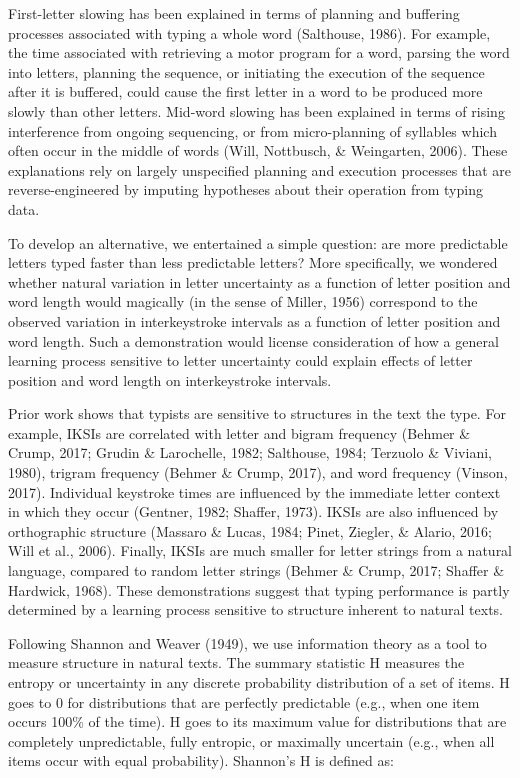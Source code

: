 \documentclass[,man,floatsintext]{apa6}
\begin{document}
First-letter slowing has been explained in terms of planning and buffering processes associated with typing a whole word (Salthouse, 1986). For example, the time associated with retrieving a motor program for a word, parsing the word into letters, planning the sequence, or initiating the execution of the sequence after it is buffered, could cause the first letter in a word to be produced more slowly than other letters. Mid-word slowing has been explained in terms of rising interference from ongoing sequencing, or from micro-planning of syllables which often occur in the middle of words (Will, Nottbusch, \& Weingarten, 2006). These explanations rely on largely unspecified planning and execution processes that are reverse-engineered by imputing hypotheses about their operation from typing data.

To develop an alternative, we entertained a simple question: are more predictable letters typed faster than less predictable letters? More specifically, we wondered whether natural variation in letter uncertainty as a function of letter position and word length would magically (in the sense of Miller, 1956) correspond to the observed variation in interkeystroke intervals as a function of letter position and word length. Such a demonstration would license consideration of how a general learning process sensitive to letter uncertainty could explain effects of letter position and word length on interkeystroke intervals.

Prior work shows that typists are sensitive to structures in the text the type. For example, IKSIs are correlated with letter and bigram frequency (Behmer \& Crump, 2017; Grudin \& Larochelle, 1982; Salthouse, 1984; Terzuolo \& Viviani, 1980), trigram frequency (Behmer \& Crump, 2017), and word frequency (Vinson, 2017). Individual keystroke times are influenced by the immediate letter context in which they occur (Gentner, 1982; Shaffer, 1973). IKSIs are also influenced by orthographic structure (Massaro \& Lucas, 1984; Pinet, Ziegler, \& Alario, 2016; Will et al., 2006). Finally, IKSIs are much smaller for letter strings from a natural language, compared to random letter strings (Behmer \& Crump, 2017; Shaffer \& Hardwick, 1968). These demonstrations suggest that typing performance is partly determined by a learning process sensitive to structure inherent to natural texts.

Following Shannon and Weaver (1949), we use information theory as a tool to measure structure in natural texts. The summary statistic H measures the entropy or uncertainty in any discrete probability distribution of a set of items. H goes to 0 for distributions that are perfectly predictable (e.g., when one item occurs 100\% of the time). H goes to its maximum value for distributions that are completely unpredictable, fully entropic, or maximally uncertain (e.g., when all items occur with equal probability). Shannon's H is defined as:
\end{document}
